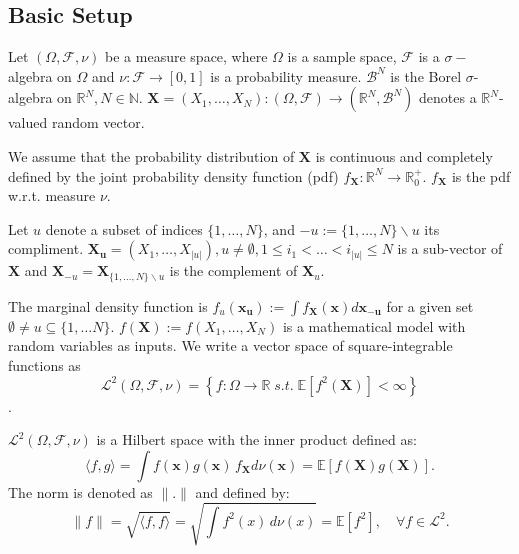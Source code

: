 \subsection*{Basic Setup}
Let $(\Omega, \mathcal{F}, \nu)$ be a measure space, where $\Omega$ is a sample space, $\mathcal{F}$ is a $\sigma-$algebra on $\Omega$ and $\nu: \mathcal{F} \rightarrow [0, 1]$ is a probability measure. $\mathcal{B}^N$ is the Borel $\sigma$-algebra on $\mathbb{R}^N, N \in \mathbb{N}$.
$\boldsymbol{X} = (X_1, \dots, X_N): (\Omega, \mathcal{F}) \rightarrow (\mathbb{R}^N, \mathcal{B}^N)$ denotes a $\mathbb{R}^N$-valued random vector.\par
We assume that the probability distribution of $\boldsymbol{X}$ is continuous and completely defined by the joint probability density function (pdf) $f_{\boldsymbol{X}}: \mathbb{R}^N \rightarrow \mathbb{R}_{0}^+$. $f_{\boldsymbol{X}}$ is the pdf w.r.t. measure $\nu$. \par

Let $u$ denote a subset of indices $\{1, \dots, N\}$, and $-u := \{1, \dots, N\} \backslash{} u$ its compliment.
$\boldsymbol{X_u} = (X_1, \dots, X_{|u|}), u \neq \emptyset, 1 \leq i_1 < \dots < i_{|u|} \leq N$ is a sub-vector of $\boldsymbol{X}$ and $\boldsymbol{X}_{-u} = \boldsymbol{X}_{\{1, \dots, N\} \backslash{} u}$ is the complement of $\boldsymbol{X}_u$.\par

The marginal density function is $f_u(\boldsymbol{x_u}) := \int f_{\boldsymbol{X}}(\boldsymbol{x})d\boldsymbol{x_{-u}}$ for a given set $\emptyset \neq u \subseteq \{1, \dots N\}$.
$f(\boldsymbol{X}) := f(X_1, \dots, X_N)$ is a mathematical model with random variables as inputs.
We write a vector space of square-integrable functions as
\[\mathcal{L}^2(\Omega, \mathcal{F}, \nu) = \left\{ f: \Omega \rightarrow \mathbb{R} \; \textit{s.t.} \; \mathbb{E}[f^2(\boldsymbol{X})] < \infty \right\}\].

$\mathcal{L}^2(\Omega, \mathcal{F}, \nu)$ is a Hilbert space with the inner product defined as:
\[
\langle f, g \rangle = \int f(\boldsymbol{x}) g(\boldsymbol{x}) \, f_{\boldsymbol{X}}d\nu(\boldsymbol{x}) = \mathbb{E}[f(\boldsymbol{X})g(\boldsymbol{X})].
\]
The norm is denoted as $\|.\| $ and defined by:
\[
\|f\| = \sqrt{\langle f, f \rangle} = \sqrt{\int f^2(x) \, d\nu(x)} = \mathbb{E}[f^2], \quad \forall f \in \mathcal{L}^2.
\]

